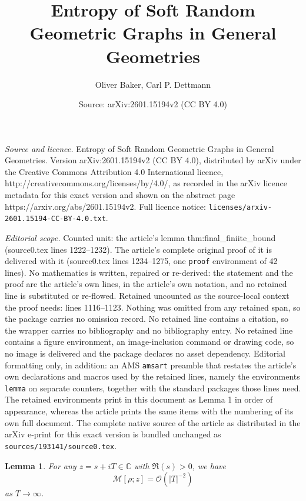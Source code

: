 \documentclass[10pt,a4paper]{amsart}
\title{Entropy of Soft Random Geometric Graphs in General Geometries}
\author{Oliver Baker, Carl P. Dettmann}
\date{Source: arXiv:2601.15194v2 (CC BY 4.0)}
\newtheorem{lemma}{Lemma}
\newcommand{\bigO}[1]{\mathcal{O}\left(#1\right)}
\newcommand{\tti}{\rightarrow\infty}
\begin{document}
\maketitle

\noindent\emph{Source and licence.} Entropy of Soft Random Geometric Graphs in General Geometries. Version arXiv:2601.15194v2 (CC BY 4.0), distributed by arXiv under the Creative Commons Attribution 4.0 International licence, http://creativecommons.org/licenses/by/4.0/, as recorded in the arXiv licence metadata for this exact version and shown on the abstract page https://arxiv.org/abs/2601.15194v2. Full licence notice: \texttt{licenses/arxiv-2601.15194-CC-BY-4.0.txt}.\par\smallskip

\noindent\textit{Editorial scope.} Counted unit: the article's lemma thm:final\_finiite\_bound (source0.tex lines 1222--1232). The article's complete original proof of it is delivered with it (source0.tex lines 1234--1275, one \texttt{proof} environment of 42 lines). No mathematics is written, repaired or re-derived: the statement and the proof are the article's own lines, in the article's own notation, and no retained line is substituted or re-flowed.  Retained uncounted as the source-local context the proof needs: lines 1116--1123.  Nothing was omitted from any retained span, so the package carries no omission record.  No retained line contains a citation, so the wrapper carries no bibliography and no bibliography entry.  No retained line contains a figure environment, an image-inclusion command or drawing code, so no image is delivered and the package declares no asset dependency.  Editorial formatting only, in addition: an AMS \texttt{amsart} preamble that restates the article's own declarations and macros used by the retained lines, namely the environments \texttt{lemma} on separate counters, together with the standard packages those lines need.  The retained environments print in this document as Lemma 1 in order of appearance, whereas the article prints the same items with the numbering of its own full document.  The complete native source of the article as distributed in the arXiv e-print for this exact version is bundled unchanged as \texttt{sources/193141/source0.tex}.
\begin{lemma}
    \label{thm:decay}
    For any $z = s+iT \in \mathbb{C}$ with $\Re(s) > 0$, we have
    \begin{equation}
        \mathcal{M}[\rho; z] = \bigO{|T|^{-2}}
    \end{equation}
    as $T\tti$.
\end{lemma}
\end{document}
